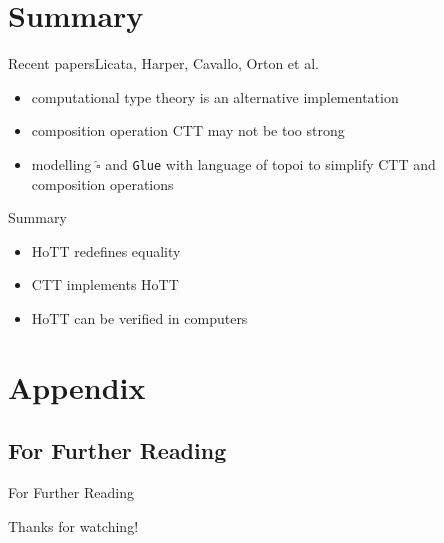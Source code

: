 \documentclass[english]{beamer}
\begin{document}
\section*{Summary}


\begin{frame}{Recent papers}{Licata, Harper, Cavallo, Orton et al.}
    \begin{itemize}
        \item computational type theory is an alternative implementation \cite{Angiuli2018}
        \item composition operation CTT may not be too strong \cite{Cavallo2019}
        \item modelling $\widehat{\square}$ and \texttt{Glue} with language of topoi to simplify CTT and composition operations \cite{Orton2019} 
    \end{itemize}
    
    
    \end{frame}



\begin{frame}{Summary}

    \begin{itemize}
        \item HoTT redefines equality
        \item CTT implements HoTT
        \item HoTT can be verified in computers 
    \end{itemize}



\end{frame}

\appendix

\section*{Appendix}

\subsection*{For Further Reading}
\begin{frame}[allowframebreaks]{For Further Reading}

Thanks for watching!



\end{frame}
\end{document}
